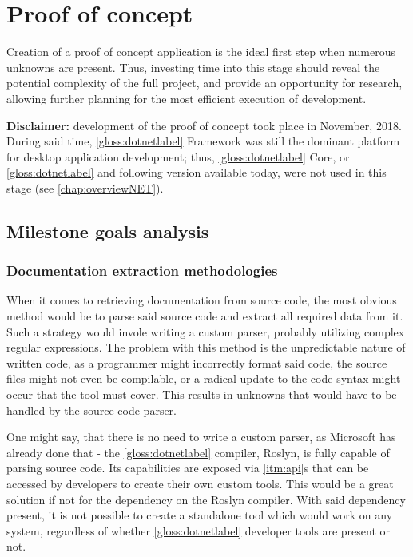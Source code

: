 \chapter{Proof of concept}

Creation of a proof of concept application is the ideal first step when numerous unknowns are present. Thus, investing time into this stage should reveal the potential complexity of the full project, and provide an opportunity for research, allowing further planning for the most efficient execution of development.

\textbf{Disclaimer:}
development of the proof of concept took place in November, 2018. During said time, \ref{gloss:dotnetlabel} Framework was still the dominant platform for desktop application development; thus, \ref{gloss:dotnetlabel} Core, or \ref{gloss:dotnetlabel} and following version available today, were not used in this stage (see \ref{chap:overviewNET}).

\section{Milestone goals analysis}

\subsection{Documentation extraction methodologies}
When it comes to retrieving documentation from source code, the most obvious method would be to parse said source code and extract all required data from it. Such a strategy would invole writing a custom parser, probably utilizing complex regular expressions. The problem with this method is the unpredictable nature of written code, as a programmer might incorrectly format said code, the source files might not even be compilable, or a radical update to the code syntax might occur that the tool must cover. This results in unknowns that would have to be handled by the source code parser.

One might say, that there is no need to write a custom parser, as Microsoft has already done that - the \ref{gloss:dotnetlabel} compiler, Roslyn, is fully capable of parsing source code. Its capabilities are exposed via \ref{itm:api}s that can be accessed by developers to create their own custom tools. This would be a great solution if not for the dependency on the Roslyn compiler. With said dependency present, it is not possible to create a standalone tool which would work on any system, regardless of whether \ref{gloss:dotnetlabel} developer tools are present or not.

